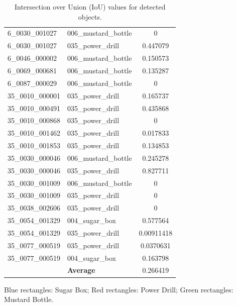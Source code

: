 \documentclass[10.5pt,a4paper]{article}
\begin{document}
\begin{table}[h]
\begin{tabular}{|l|l|c|}
        6\_0030\_001027 & 006\_mustard\_bottle & 0 \\
        6\_0030\_001027 & 035\_power\_drill & 0.447079 \\
        6\_0046\_000002 & 006\_mustard\_bottle & 0.150573 \\
        6\_0069\_000681 & 006\_mustard\_bottle & 0.135287 \\
        6\_0087\_000029 & 006\_mustard\_bottle & 0 \\
        35\_0010\_000001 & 035\_power\_drill & 0.165737 \\
        35\_0010\_000491 & 035\_power\_drill & 0.435868 \\
        35\_0010\_000868 & 035\_power\_drill & 0 \\
        35\_0010\_001462 & 035\_power\_drill & 0.017833 \\
        35\_0010\_001853 & 035\_power\_drill & 0.134853 \\
        35\_0030\_000046 & 006\_mustard\_bottle & 0.245278 \\
        35\_0030\_000046 & 035\_power\_drill & 0.827711 \\
        35\_0030\_001009 & 006\_mustard\_bottle & 0 \\
        35\_0030\_001009 & 035\_power\_drill & 0 \\
        35\_0038\_002606 & 035\_power\_drill & 0 \\
        35\_0054\_001329 & 004\_sugar\_box & 0.577564 \\
        35\_0054\_001329 & 035\_power\_drill & 0.00911418 \\
        35\_0077\_000519 & 035\_power\_drill & 0.0370631 \\
        35\_0077\_000519 & 004\_sugar\_box & 0.163798 \\
        & \textbf{Average} &   0.266419 \\
        \hline
    \end{tabular}
    \caption{Intersection over Union (IoU) values for detected objects.}
    \label{tab:IoU-detection}
\end{table}

\centering
Blue rectangles: Sugar Box; Red rectangles: Power Drill; Green rectangles: Mustard Bottle.
\end{document}
